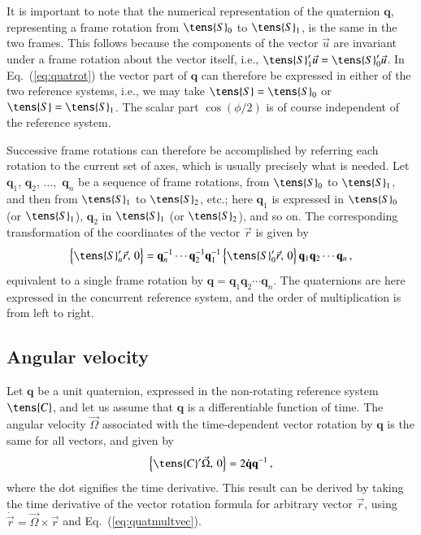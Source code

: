 \documentclass[structabstract]{aa}
\newcommand{\quat}[1]{\mathbf{#1}}
\begin{document}
It is important to note that the numerical representation of the 
quaternion $\quat{q}$, representing a frame rotation from 
$\tens{S}_0$ to $\tens{S}_1$, is the same in the two frames. 
This follows because the components of the vector $\vec{u}$
are invariant under a frame rotation about the vector itself, i.e., 
$\tens{S}_1'\vec{u}=\tens{S}_0'\vec{u}$. In Eq.~(\ref{eq:quatrot}) 
the vector part of $\quat{q}$ can therefore 
be expressed in either of the two reference systems, i.e., we may
take $\tens{S}=\tens{S}_0$ or $\tens{S}=\tens{S}_1$. The scalar part 
$\cos(\phi/2)$ is of course independent of the reference system. 

Successive frame rotations can therefore be accomplished by referring
each rotation to the current set of axes, which is usually precisely
what is needed. Let $\quat{q}_1$, $\quat{q}_2$, $\dots,$ $\quat{q}_n$
be a sequence of frame rotations, from $\tens{S}_0$ to $\tens{S}_1$,
and then from $\tens{S}_1$ to $\tens{S}_2$, etc.; here $\quat{q}_1$ 
is expressed in $\tens{S}_0$ (or $\tens{S}_1$), $\quat{q}_2$ in
$\tens{S}_1$ (or $\tens{S}_2$), and so on. The corresponding 
transformation of the coordinates of the vector $\vec{r}$ is given by 
\begin{equation}\label{eq:quatframerot1}
\Bigl\{\tens{S}_n'\vec{r},\,0\Bigr\}
=\quat{q}_n^{-1}\cdots\quat{q}_2^{-1}\quat{q}_1^{-1}
\,\Bigl\{\tens{S}_0'\vec{r},\,0\Bigr\}\,
\quat{q}_1\quat{q}_2\cdots\quat{q}_n \, ,
\end{equation}
equivalent to a single frame rotation by 
$\quat{q}=\quat{q}_1\quat{q}_2\cdots\quat{q}_n$.
The quaternions are here expressed in the concurrent reference system,
and the order of multiplication is from left to right.


\subsection{Angular velocity}\label{sec:angvel}

Let $\quat{q}$ be a unit quaternion, expressed in the non-rotating 
reference system $\tens{C}$, and let us assume that $\quat{q}$ is a 
differentiable function of time. The angular velocity $\vec{\Omega}$ 
associated with the time-dependent vector rotation by $\quat{q}$ 
is the same for all vectors, and given by
\begin{equation}\label{eq:quatangvel}
\Bigl\{\tens{C}'\vec{\Omega},\,0\Bigr\}=2\quat{\dot{q}}\quat{q}^{-1} \, ,
\end{equation}
where the dot signifies the time derivative. This result can be derived
by taking the time derivative of the vector rotation formula for arbitrary
vector $\vec{r}$, using $\dot{\vec{r}}=\vec{\Omega}\times\vec{r}$
and Eq.~(\ref{eq:quatmultvec}).
\end{document}

